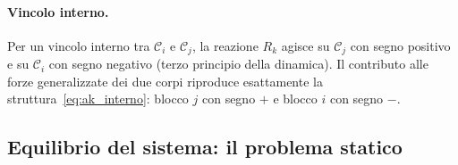 \paragraph{Vincolo interno.}
Per un vincolo interno tra $\mathcal{C}_i$ e $\mathcal{C}_j$,
la reazione $R_k$ agisce su $\mathcal{C}_j$ con segno positivo
e su $\mathcal{C}_i$ con segno negativo (terzo principio della
dinamica). Il contributo alle forze generalizzate dei due corpi
riproduce esattamente la struttura~\eqref{eq:ak_interno}:
blocco $j$ con segno $+$ e blocco $i$ con segno $-$.


\subsection{Equilibrio del sistema: il problema statico}
\label{sec:prob_stat}

